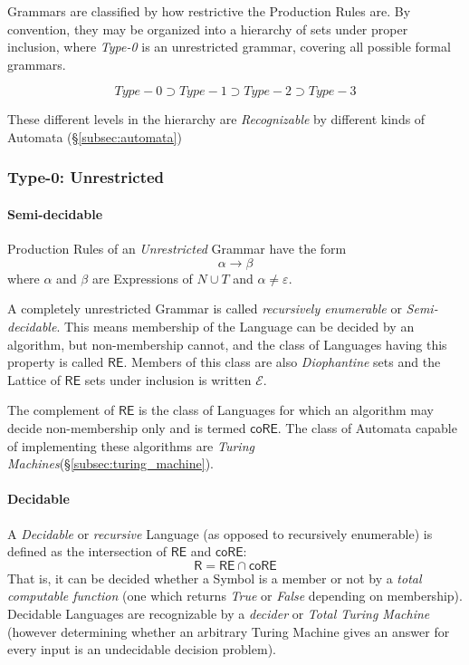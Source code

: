 \documentclass{article}
\begin{document}
Grammars are classified by how restrictive the Production Rules
are. By convention, they may be organized into a hierarchy of sets
under proper inclusion, where \emph{Type-0} is an unrestricted grammar,
covering all possible formal grammars.

\[
    Type-0 \supset Type-1 \supset Type-2 \supset Type-3
\]

These different levels in the hierarchy are \emph{Recognizable} by
different kinds of Automata (\S \ref{subsec:automata})

\subsubsection{Type-0: Unrestricted}

\paragraph{Semi-decidable}\label{subsec:semidecidable}
Production Rules of an \emph{Unrestricted} Grammar have the form
\[
    \alpha \rightarrow \beta
\]
where $\alpha$ and $\beta$ are Expressions of $N \cup T$ and $\alpha
\neq \varepsilon$.

A completely unrestricted Grammar is called \emph{recursively
  enumerable} or \emph{Semi-decidable}. This means membership of the
Language can be decided by an algorithm, but non-membership cannot,
and the class of Languages having this property is called
$\mathsf{RE}$. Members of this class are also \emph{Diophantine} sets
and the Lattice of $\mathsf{RE}$ sets under inclusion is written
$\mathcal{E}$. %

The complement of $\mathsf{RE}$ is the class of Languages for which
an algorithm may decide non-membership only and is termed
$\mathsf{coRE}$. The class of Automata capable of implementing these
algorithms are \emph{Turing Machines}(\S\ref{subsec:turing_machine}).

\paragraph{Decidable}\label{subsec:decidability}
A \emph{Decidable} or \emph{recursive} Language (as opposed to
recursively enumerable) is defined as the intersection of
$\mathsf{RE}$ and $\mathsf{coRE}$:
\[
    \mathsf{R} = \mathsf{RE} \cap \mathsf{coRE}
\]
That is, it can be decided whether a Symbol is a member or not by a
\emph{total computable function} (one which returns \emph{True} or
\emph{False} depending on membership). Decidable Languages are
recognizable by a \emph{decider} or \emph{Total Turing
  Machine}\cite{kozen97} (however determining whether an arbitrary
Turing Machine gives an answer for every input is an undecidable
decision problem).
\end{document}
